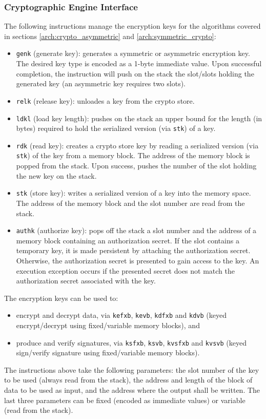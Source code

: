 \subsubsection{Cryptographic Engine Interface}
The following instructions manage the encryption keys for the algorithms 
covered in sections \ref{arch:crypto_asymmetric} and
\ref{arch:symmetric_crypto}:
\begin{itemize}
  \item \texttt{genk} (generate key): generates a symmetric or asymmetric
  encryption key. The desired key type is encoded as a 1-byte immediate value.
  Upon successful completion, the instruction will push on the stack the
  slot/slots holding the generated key (an asymmetric key requires two slots).
  \item \texttt{relk} (release key): unloades a key from the crypto store.
  \item \texttt{ldkl} (load key length): pushes on the stack an upper bound for
  the length (in bytes) required to hold the serialized version (via
  \texttt{stk}) of a key.
  \item \texttt{rdk} (read key): creates a crypto store key by reading
  a serialized version (via \texttt{stk}) of the key from a memory block. The
  address of the memory block is popped from the stack. Upon success, pushes the
  number of the slot holding the new key on the stack.
  \item \texttt{stk} (store key): writes a serialized version of a key into the
  memory space. The address of the memory block and the slot number are read
  from the stack.
  \item \texttt{authk} (authorize key): pops off the stack a slot number and
  the address of a memory block containing an authorization secret. If the slot
  contains a temporary key, it is made persistent by attaching the authorization
  secret. Otherwise, the authorization secret is presented to gain access to
  the key. An execution exception occurs if the presented secret does not match
  the authorization secret associated with the key.
\end{itemize}

The encryption keys can be used to:
\begin{itemize}
  \item encrypt and decrypt data, via \texttt{kefxb}, \texttt{kevb},
  \texttt{kdfxb} and \texttt{kdvb} (keyed encrypt/decrypt using fixed/variable
  memory blocks), and
  \item produce and verify signatures, via \texttt{ksfxb}, \texttt{ksvb},
  \texttt{kvsfxb} and \texttt{kvsvb} (keyed sign/verify signature using
  fixed/variable memory blocks).     
\end{itemize}
The instructions above take the following parameters: the slot number of the
key to be used (always read from the stack), the address and length of the
block of data to be used as input, and the address where the output shall be
written. The last three parameters can be fixed (encoded as immediate values) or
variable (read from the stack).

